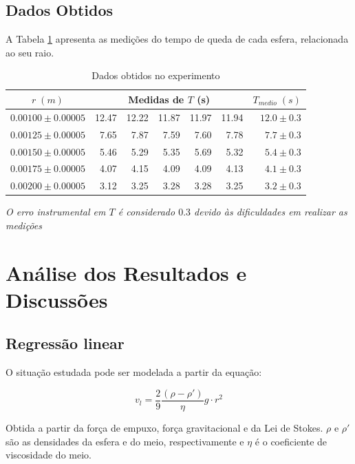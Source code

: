 \documentclass[12pt,a4paper]{article}
\begin{document}
\subsection{Dados Obtidos}

A Tabela \ref{dados} apresenta as medições do tempo de queda de cada esfera, relacionada ao seu raio.

\begin{table}[!htbp]

\centering
\def\arraystretch{1.5}
\caption{Dados obtidos no experimento}

\begin{tabular}{|c|rrrrr|r|}
\hline
$ r \; (m)$ & \multicolumn{5}{c|}{Medidas de $T$ \;  (s)} & $T_{medio} \; (s)$  \\
\hline
  $ 0.00100 \pm 0.00005 $ &12.47 & 12.22 & 11.87 & 11.97 & 11.94 & $ 12.0 \pm 0.3 $ \\
  \hline
  $ 0.00125 \pm 0.00005 $ &7.65 & 7.87 & 7.59 & 7.60 & 7.78  & $ 7.7 \pm 0.3 $   \\
  \hline
  $ 0.00150 \pm 0.00005 $ &5.46 & 5.29 & 5.35 & 5.69 & 5.32 & $ 5.4 \pm 0.3 $     \\
  \hline
  $ 0.00175 \pm 0.00005 $ &4.07 & 4.15 & 4.09 & 4.09 & 4.13  & $ 4.1 \pm 0.3 $    \\
  \hline
  $ 0.00200 \pm 0.00005 $ &3.12 & 3.25 & 3.28 & 3.28 & 3.25 & $ 3.2 \pm 0.3 $       \\
\hline
\end{tabular}

\emph{O erro instrumental em $T$ é considerado $0.3$ devido às dificuldades em realizar as medições}
\label{dados}
\end{table}




\section{Análise dos Resultados e Discussões}
\subsection{Regressão linear}
O situação estudada pode ser modelada a partir da equação: 

$$ v_l = \frac{2}{9} \frac{(\rho - \rho ')}{\eta}g \cdot r^2$$

Obtida a partir da força de empuxo, força gravitacional e da Lei de Stokes. $\rho$ e $\rho '$ são as densidades da esfera e do meio, respectivamente e $\eta$ é o coeficiente de viscosidade do meio.
\end{document}
